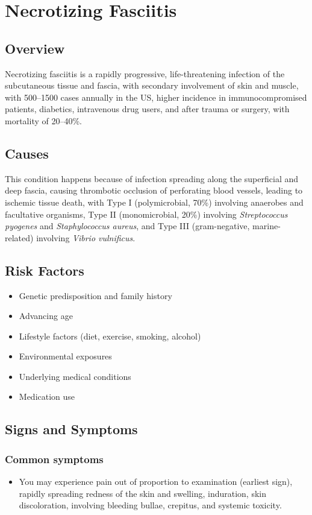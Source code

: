 \chapter{Necrotizing Fasciitis}
\label{sec:Necrotizing Fasciitis}

\section{Overview}
Necrotizing fasciitis is a rapidly progressive, life-threatening infection of the subcutaneous tissue and fascia, with secondary involvement of skin and muscle, with 500--1500 cases annually in the US, higher incidence in immunocompromised patients, diabetics, intravenous drug users, and after trauma or surgery, with mortality of 20--40\%.
\section{Causes}
This condition happens because of infection spreading along the superficial and deep fascia, causing thrombotic occlusion of perforating blood vessels, leading to ischemic tissue death, with Type I (polymicrobial, 70\%) involving anaerobes and facultative organisms, Type II (monomicrobial, 20\%) involving \textit{Streptococcus pyogenes} and \textit{Staphylococcus aureus}, and Type III (gram-negative, marine-related) involving \textit{Vibrio vulnificus}.     
\section{Risk Factors}

\begin{itemize}[noitemsep]
  \item Genetic predisposition and family history
  \item Advancing age
  \item Lifestyle factors (diet, exercise, smoking, alcohol)
  \item Environmental exposures
  \item Underlying medical conditions
  \item Medication use
\end{itemize}
\section{Signs and Symptoms}

\subsection{Common symptoms}
\begin{itemize}[noitemsep]
  \item You may experience pain out of proportion to examination (earliest sign), rapidly spreading redness of the skin and swelling, induration, skin discoloration, involving bleeding bullae, crepitus, and systemic toxicity. 
  \end{itemize}

